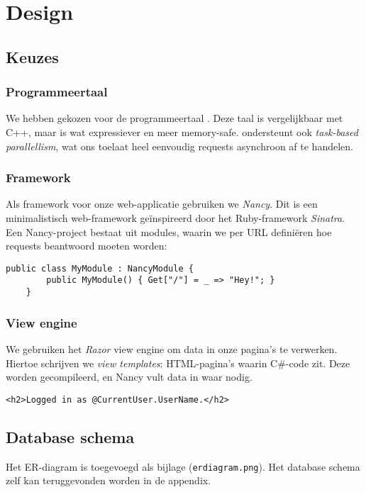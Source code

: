 \documentclass[12pt,draft,parskip=full]{article}
\begin{document}
\section{Design}

\subsection{Keuzes}
\subsubsection{Programmeertaal}
We hebben gekozen voor de programmeertaal \CS{}. Deze taal is vergelijkbaar met C++, maar is wat expressiever en meer memory-safe. \CS{} ondersteunt ook \textit{task-based parallellism}, wat ons toelaat heel eenvoudig requests asynchroon af te handelen.

\subsubsection{Framework}
Als framework voor onze web-applicatie gebruiken we \textit{Nancy}. Dit is een
minimalistisch web-framework ge\"inspireerd door het Ruby-framework
\textit{Sinatra}. Een Nancy-project bestaat uit modules, waarin we per URL
defini\"eren hoe requests beantwoord moeten worden:

\begin{lstlisting}[caption=Een \textit{hello world}-applicatie in Nancy]
    public class MyModule : NancyModule {
        public MyModule() { Get["/"] = _ => "Hey!"; }
    }
\end{lstlisting}

\subsubsection{View engine}
We gebruiken het \textit{Razor} view engine om data in onze pagina's te
verwerken. Hiertoe schrijven we \textit{view templates}: HTML-pagina's waarin
C\#-code zit. Deze worden gecompileerd, en Nancy vult data in waar nodig.

\lstset{language=HTML}
\begin{lstlisting}[caption=Een simpel voorbeeld van een Razor view, label=razor]
    <h2>Logged in as @CurrentUser.UserName.</h2>
\end{lstlisting}

\subsection{Database schema}
Het ER-diagram is toegevoegd als bijlage (\texttt{erdiagram.png}). Het database schema zelf kan teruggevonden worden in de appendix.
\end{document}
